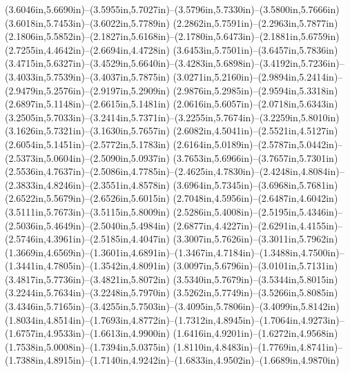 (3.6046in,5.6690in)--(3.5955in,5.7027in)--(3.5796in,5.7330in)--(3.5800in,5.7666in) (3.6018in,5.7453in)--(3.6022in,5.7789in) (2.2862in,5.7591in)--(2.2963in,5.7877in) (2.1806in,5.5852in)--(2.1827in,5.6168in)--(2.1780in,5.6473in)--(2.1881in,5.6759in) (2.7255in,4.4642in)--(2.6694in,4.4728in) (3.6453in,5.7501in)--(3.6457in,5.7836in) (3.4715in,5.6327in)--(3.4529in,5.6640in)--(3.4283in,5.6898in)--(3.4192in,5.7236in)--(3.4033in,5.7539in)--(3.4037in,5.7875in) (3.0271in,5.2160in)--(2.9894in,5.2414in)--(2.9479in,5.2576in)--(2.9197in,5.2909in) (2.9876in,5.2985in)--(2.9594in,5.3318in) (2.6897in,5.1148in)--(2.6615in,5.1481in) (2.0616in,5.6057in)--(2.0718in,5.6343in) (3.2505in,5.7033in)--(3.2414in,5.7371in)--(3.2255in,5.7674in)--(3.2259in,5.8010in) (3.1626in,5.7321in)--(3.1630in,5.7657in) (2.6082in,4.5041in)--(2.5521in,4.5127in) (2.6054in,5.1451in)--(2.5772in,5.1783in) (2.6164in,5.0189in)--(2.5787in,5.0442in)--(2.5373in,5.0604in)--(2.5090in,5.0937in) (3.7653in,5.6966in)--(3.7657in,5.7301in) (2.5536in,4.7637in)--(2.5086in,4.7785in)--(2.4625in,4.7830in)--(2.4248in,4.8084in)--(2.3833in,4.8246in)--(2.3551in,4.8578in) (3.6964in,5.7345in)--(3.6968in,5.7681in) (2.6522in,5.5679in)--(2.6526in,5.6015in) (2.7048in,4.5956in)--(2.6487in,4.6042in) (3.5111in,5.7673in)--(3.5115in,5.8009in) (2.5286in,5.4008in)--(2.5195in,5.4346in)--(2.5036in,5.4649in)--(2.5040in,5.4984in) (2.6877in,4.4227in)--(2.6291in,4.4155in)--(2.5746in,4.3961in)--(2.5185in,4.4047in) (3.3007in,5.7626in)--(3.3011in,5.7962in) (1.3669in,4.6569in)--(1.3601in,4.6891in)--(1.3467in,4.7184in)--(1.3488in,4.7500in)--(1.3441in,4.7805in)--(1.3542in,4.8091in) (3.0097in,5.6796in)--(3.0101in,5.7131in) (3.4817in,5.7736in)--(3.4821in,5.8072in) (3.5340in,5.7679in)--(3.5344in,5.8015in) (3.2244in,5.7634in)--(3.2248in,5.7970in) (3.5262in,5.7749in)--(3.5266in,5.8085in) (3.4346in,5.7165in)--(3.4255in,5.7503in)--(3.4095in,5.7806in)--(3.4099in,5.8142in) (1.8034in,4.8514in)--(1.7693in,4.8772in)--(1.7312in,4.8945in)--(1.7064in,4.9273in)--(1.6757in,4.9533in)--(1.6613in,4.9900in) (1.6416in,4.9201in)--(1.6272in,4.9568in) (1.7538in,5.0008in)--(1.7394in,5.0375in) (1.8110in,4.8483in)--(1.7769in,4.8741in)--(1.7388in,4.8915in)--(1.7140in,4.9242in)--(1.6833in,4.9502in)--(1.6689in,4.9870in)
